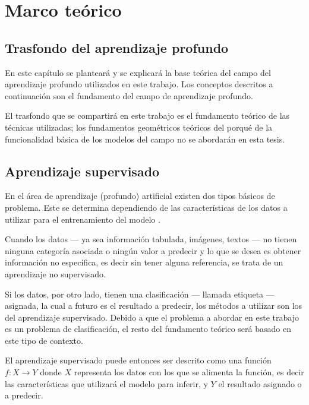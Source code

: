 \chapter{Marco teórico} %

\label{Chapter2} %

\section{Trasfondo del aprendizaje profundo} %

En este capítulo se planteará y se explicará la base teórica del campo del aprendizaje profundo utilizados en este trabajo. Los conceptos descritos a continuación son el fundamento del campo de aprendizaje profundo.

El trasfondo que se compartirá en este trabajo es el fundamento teórico de las técnicas utilizadas; los fundamentos geométricos teóricos \parencite{2018leigeometric} del porqué de la funcionalidad básica de los modelos del campo no se abordarán en esta tesis.

\section{Aprendizaje supervisado}

En el área de aprendizaje (profundo) artificial existen dos tipos básicos de problema. Este se determina dependiendo de las características de los datos a utilizar para el entrenamiento del modelo \parencite{schmidhuber2015deep}.

Cuando los datos --- ya sea información tabulada, imágenes, textos --- no tienen ninguna categoría asociada o ningún valor a predecir y lo que se desea es obtener información no específica, es decir sin tener alguna referencia, se trata de un aprendizaje no supervisado.

Si los datos, por otro lado, tienen una clasificación  --- llamada etiqueta --- asignada, la cual a futuro es el resultado a predecir, los métodos a utilizar son los del \gls{aprendizaje supervisado}. Debido a que el problema a abordar en este trabajo es un problema de clasificación, el resto del fundamento teórico será basado en este tipo de contexto.

El aprendizaje supervisado puede entonces ser descrito como una función $f : X \to Y$ donde $X$ representa los datos con los que se alimenta la función, es decir las características que utilizará el modelo para inferir, y $Y$ el resultado asignado o a predecir.

